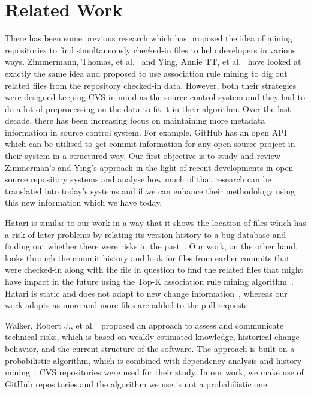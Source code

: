 
\section{Related Work}
\label{sec:related}

There has been some previous research which has proposed the idea of mining repositories to find simultaneously checked-in files to help developers in various ways. Zimmermann, Thomas, et al.~\cite{zimmermann2005mining} and Ying, Annie TT, et al.~\cite{ying2004predicting} have looked at exactly the same idea and proposed to use association rule mining to dig out related files from the repository checked-in data. However, both their strategies were designed keeping CVS in mind as the source control system and they had to do a lot of preprocessing on the data to fit it in their algorithm. Over the last decade, there has been increasing focus on maintaining more metadata information in source control system. For example, GitHub has an open API which can be utilised to get commit information for any open source project in their system in a structured way. Our first objective is to study and review Zimmerman's and Ying's approach in the light of recent developments in open source repository systems and analyse how much of that research can be translated into today's systems and if we can enhance their methodology using this new information which we have today.

Hatari is similar to our work in a way that it shows the location of files which has a risk of later problems by relating its version history to a bug database and finding out whether there were risks in the past~\cite{sliwerski2005hatari}. Our work, on the other hand, looks through the commit history and look for files from earlier commits that were checked-in along with the file in question to find the related files that might have impact in the future using the Top-K association rule mining algorithm~\cite{fournier2012mining}. Hatari is static and does not adapt to new change information~\cite{kim2007predicting}, whereas our work adapts as more and more files are added to the pull requests.

Walker, Robert J., et al.~\cite{walker2006lightweight} proposed an approach to assess and communicate technical risks, which is based on weakly-estimated knowledge, historical change behavior, and the current structure of the software. The approach is built on a probabilistic algorithm, which is combined with dependency analysis and history mining~\cite{lehnert2011review}. CVS repositories were used for their study. In our work, we make use of GitHub repositories and the algorithm we use is not a probabilistic one.






